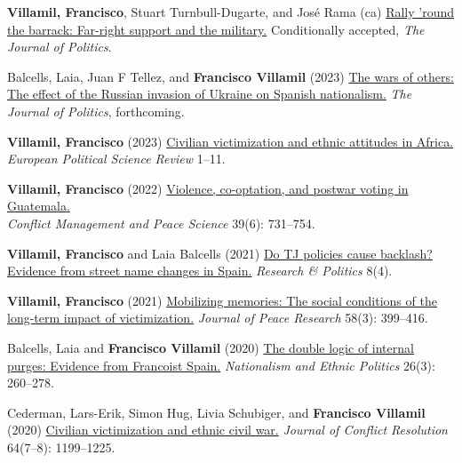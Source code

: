 \documentclass[a4paper, 12pt]{article}
\begin{document}
\begin{etaremune}[leftmargin=12pt, itemsep=0pt]
\item \textbf{Villamil, Francisco}, Stuart Turnbull-Dugarte, and José Rama (ca) \href{https://t.co/YMMWEEAb17}{Rally 'round the barrack: Far-right support and the military.} Conditionally accepted, \textit{The Journal of Politics}.
\item Balcells, Laia, Juan F Tellez, and \textbf{Francisco Villamil} (2023) \href{https://www.laiabalcells.com/wp-content/uploads/Ukraine_and_Spanish_Nationalism.pdf}{The wars of others: The effect of the Russian invasion of Ukraine on Spanish nationalism.} \textit{The Journal of Politics}, forthcoming.
\item \textbf{Villamil, Francisco} (2023) \href{https://doi.org/10.1017/S1755773923000097}{Civilian victimization and ethnic attitudes in Africa.}\\\textit{European Political Science Review} 1--11.
\item \textbf{Villamil, Francisco} (2022) \href{https://journals.sagepub.com/doi/full/10.1177/07388942211066539}{Violence, co-optation, and postwar voting in Guatemala.}\\\textit{Conflict Management and Peace Science} 39(6): 731--754.
\item \textbf{Villamil, Francisco} and Laia Balcells (2021) \href{https://journals.sagepub.com/doi/full/10.1177/20531680211058550}{Do TJ policies cause backlash? Evidence from street name changes in Spain.} \textit{Research \& Politics} 8(4).
\item \textbf{Villamil, Francisco} (2021) \href{https://doi.org/10.1177/0022343320912816}{Mobilizing memories: The social conditions of the long-term impact of victimization.} \textit{Journal of Peace Research} 58(3): 399--416.
\item Balcells, Laia and \textbf{Francisco Villamil} (2020) \href{https://doi.org/10.1080/13537113.2020.1795451}{The double logic of internal purges: Evidence from Francoist Spain.} \textit{Nationalism and Ethnic Politics} 26(3): 260--278.
\item Cederman, Lars-Erik, Simon Hug, Livia Schubiger, and \textbf{Francisco Villamil} (2020) \href{https://doi.org/10.1177/0022002719898873}{Civilian victimization and ethnic civil war.} \textit{Journal of Conflict Resolution} 64(7--8): 1199--1225.
\end{etaremune}
\end{document}
